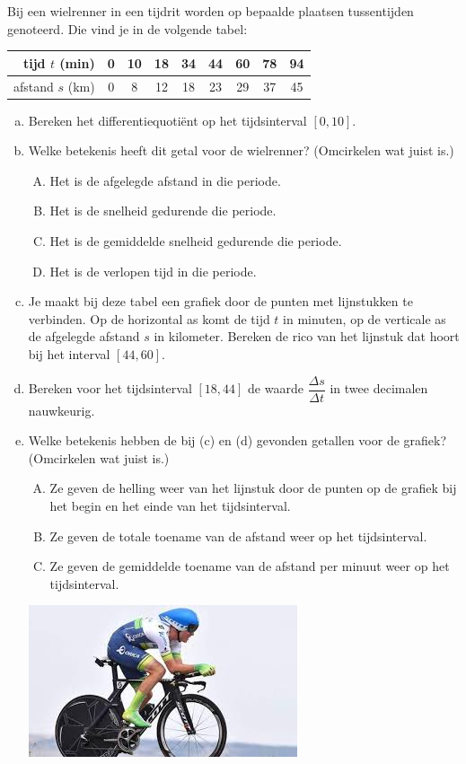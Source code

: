 \documentclass[12pt]{article}
\begin{document}
\begin{oefening}
Bij een wielrenner in een tijdrit worden op bepaalde plaatsen tussentijden genoteerd. Die vind je in de volgende tabel:

\begin{center}
  \begin{tabular}{r|cccccccc}
  tijd $t$ (min) & 0 & 10 & 18 & 34 & 44 & 60 & 78 & 94\\
  \hline
  afstand $s$ (km) & 0 & 8 & 12 & 18 & 23 & 29 & 37 & 45\\
  \end{tabular}
\end{center}

\begin{enumerate}[(a)]
  \item Bereken het differentiequotiënt op het tijdsinterval $[0,10]$.
  \item Welke betekenis heeft dit getal voor de wielrenner? (Omcirkelen wat juist is.)
  \begin{enumerate}[(A)]
    \item Het is de afgelegde afstand in die periode.
    \item Het is de snelheid gedurende die periode.
    \item Het is de gemiddelde snelheid gedurende die periode.
    \item Het is de verlopen tijd in die periode.
  \end{enumerate}
  \item Je maakt bij deze tabel een grafiek door de punten met lijnstukken te verbinden. Op de horizontal as komt de tijd $t$ in minuten, op de verticale as de afgelegde afstand $s$ in kilometer. Bereken de rico van het lijnstuk dat hoort bij het interval $[44,60]$.
  \item Bereken voor het tijdsinterval $[18,44]$ de waarde $\dfrac{\Delta s}{\Delta t}$ in twee decimalen nauwkeurig.
  \item Welke betekenis hebben de bij (c) en (d) gevonden getallen voor de grafiek? (Omcirkelen wat juist is.)
  \begin{enumerate}[(A)]
    \item Ze geven de helling weer van het lijnstuk door de punten op de grafiek bij het begin en het einde van het tijdsinterval.
    \item Ze geven de totale toename van de afstand weer op het tijdsinterval.
    \item Ze geven de gemiddelde toename van de afstand per minuut weer op het tijdsinterval.
  \end{enumerate}
  \begin{center}
  \includegraphics{tijdrit}
  \end{center}
\end{enumerate}


\end{oefening}
\end{document}
